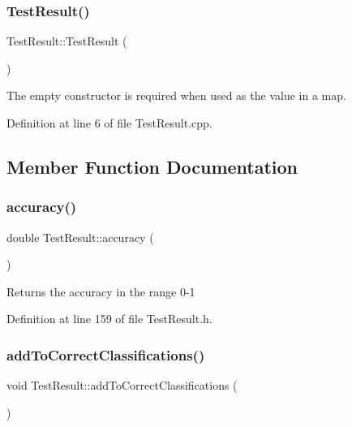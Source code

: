\subsubsection{\texorpdfstring{Test\+Result()}{TestResult()}}
{\footnotesize\ttfamily Test\+Result\+::\+Test\+Result (\begin{DoxyParamCaption}{ }\end{DoxyParamCaption})}

The empty constructor is required when used as the value in a map. 

Definition at line 6 of file Test\+Result.\+cpp.



\subsection{Member Function Documentation}
\mbox{\label{class_test_result_acf90ffd2fa4e6d459ee75747ea07cc93}} 
\subsubsection{\texorpdfstring{accuracy()}{accuracy()}}
{\footnotesize\ttfamily double Test\+Result\+::accuracy (\begin{DoxyParamCaption}{ }\end{DoxyParamCaption})\hspace{0.3cm}{\ttfamily [inline]}}

Returns the accuracy in the range 0-\/1 

Definition at line 159 of file Test\+Result.\+h.

\mbox{\label{class_test_result_a4a46aaf2d355f73c2fd366945ed46496}} 
\subsubsection{\texorpdfstring{add\+To\+Correct\+Classifications()}{addToCorrectClassifications()}}
{\footnotesize\ttfamily void Test\+Result\+::add\+To\+Correct\+Classifications (\begin{DoxyParamCaption}{ }\end{DoxyParamCaption})\hspace{0.3cm}{\ttfamily [inline]}}



